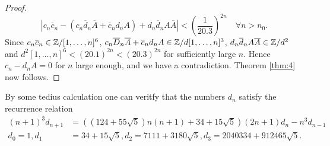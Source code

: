 \begin{proof}
    \begin{equation}
        \label{eqn:7}
        |c_n \overline{c}_n - (c_n \overline{d}_n \overline{A} + \overline{c}_n d_n A) + d_n \overline{d}_n A\overline{A}| < \left(\frac{1}{20.3}\right)^{2n} \quad \forall n > n_0.
    \end{equation}
    Since $c_n \overline{c}_n \in \mathbb{Z} / [1, \dots, n]^{6}$, $c_n \overline{D}_n \overline{A} + \overline{c}_n d_n A \in \mathbb{Z} / d[1, \dots, n]^{3}$, $d_n \overline{d}_n A \overline{A} \in \mathbb{Z} / d^2$ and $d^2 [1, \dots, n]^6 < (20.1)^{2n} < (20.3)^{2n}$ for sufficiently large $n$.
    Hence $c_n - d_n A = 0$ for $n$ large enough, and we have a contradiction.
    Theorem \ref{thm:4} now follows.
\end{proof}

\begin{remark*}
By some tedius calculation one can veritfy that the numbers $d_n$ satisfy the recurrence relation 
\begin{align*}
    (n + 1)^{3} d_{n+1} &= ((124 + 55\sqrt{5})n(n+1) + 34 + 15\sqrt{5}) (2n + 1)d_n - n^3 d_{n-1} \\
    d_0 = 1, d_1 &= 34 + 15\sqrt{5}, d_2 = 7111 + 3180 \sqrt{5}, d_3 = 2040334 + 912465\sqrt{5}.
\end{align*}
\end{remark*}

